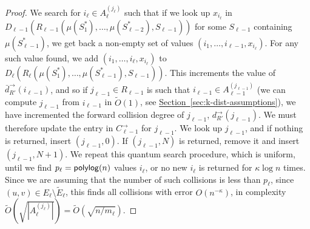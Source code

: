 \documentclass{theoretics}
\renewcommand{\sec}[1]{\hyperref[sec:#1]{Section~\ref*{sec:#1}}}
\renewcommand{\>}{\rangle}
\newcommand{\<}{\langle}
\renewcommand{\(}{\left(}
\renewcommand{\)}{\right)}
\begin{document}
\begin{proof}
We search for $i_{\ell}\in A_{\ell}^{(j_{\ell})}$ such that if we look up $x_{i_{\ell}}$ in $D_{\ell-1}(R_{\ell-1}(\mu(S_1^*),\dots,\mu(S_{\ell-2}^*),S_{\ell-1}))$ for some $S_{\ell-1}$ containing $\mu(S_{\ell-1}^*)$, we get back a non-empty set of values $(i_1,\dots,i_{\ell-1},x_{i_{\ell}})$. For any such value found, we add $(i_1,\dots,i_{\ell},x_{i_{\ell}})$ to $D_{\ell}(R_{\ell}(\mu(S_1^*),\dots,\mu(S_{\ell-1}^*),S_{\ell-1}))$. This increments the value of $\bar{d}_{R'}^{\rightarrow}(i_{\ell-1})$, and so if $j_{\ell-1}\in R_{\ell-1}$ is such that $i_{\ell-1}\in A_{\ell-1}^{(j_{\ell-1})}$ (we can compute $j_{\ell-1}$ from $i_{\ell-1}$ in $\widetilde{O}(1)$, see \sec{k-dist-assumptions}), we have incremented the forward collision degree of $j_{\ell-1}$, $d_{R'}^{\rightarrow}(j_{\ell-1})$. We must therefore update the entry in $C^{\rightarrow}_{\ell-1}$ for $j_{\ell-1}$. We look up $j_{\ell-1}$, and if nothing is returned, insert $(j_{\ell-1},0)$. If $(j_{\ell-1},N)$ is returned, remove it and insert $(j_{\ell-1},N+1)$. 
We repeat this quantum search procedure, which is uniform, until we find $p_{\ell}={\sf polylog}(n)$ values $i_{\ell}$, or no new $i_{\ell}$ is returned for $\kappa\log n$ times. Since  we are assuming that the number of such collisions is less than $p_{\ell}$, since $(u,v)\in E_{\ell}\setminus\tilde{E}_{\ell}$, this finds all collisions with error $O(n^{-\kappa})$, in complexity 
	$\widetilde{O}\left(\sqrt{|A_{\ell}^{(j_{\ell})}|}\right)=\widetilde{O}(\sqrt{n/m_{\ell}})$.
\end{proof}
\end{document}
